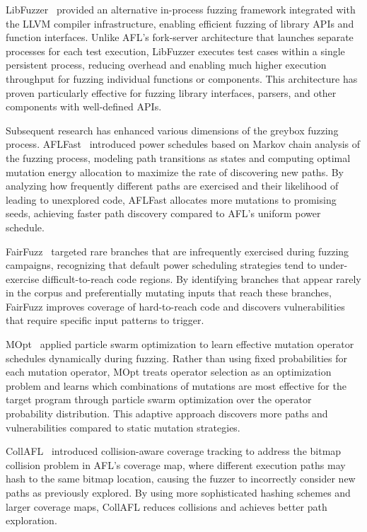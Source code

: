 \documentclass[review]{elsarticle}
\begin{document}
LibFuzzer~\cite{libfuzzer} provided an alternative in-process fuzzing framework integrated with the LLVM compiler infrastructure, enabling efficient fuzzing of library APIs and function interfaces. Unlike AFL's fork-server architecture that launches separate processes for each test execution, LibFuzzer executes test cases within a single persistent process, reducing overhead and enabling much higher execution throughput for fuzzing individual functions or components. This architecture has proven particularly effective for fuzzing library interfaces, parsers, and other components with well-defined APIs.

Subsequent research has enhanced various dimensions of the greybox fuzzing process. AFLFast~\cite{aflfast} introduced power schedules based on Markov chain analysis of the fuzzing process, modeling path transitions as states and computing optimal mutation energy allocation to maximize the rate of discovering new paths. By analyzing how frequently different paths are exercised and their likelihood of leading to unexplored code, AFLFast allocates more mutations to promising seeds, achieving faster path discovery compared to AFL's uniform power schedule.

FairFuzz~\cite{fairfuzz} targeted rare branches that are infrequently exercised during fuzzing campaigns, recognizing that default power scheduling strategies tend to under-exercise difficult-to-reach code regions. By identifying branches that appear rarely in the corpus and preferentially mutating inputs that reach these branches, FairFuzz improves coverage of hard-to-reach code and discovers vulnerabilities that require specific input patterns to trigger.

MOpt~\cite{mopt} applied particle swarm optimization to learn effective mutation operator schedules dynamically during fuzzing. Rather than using fixed probabilities for each mutation operator, MOpt treats operator selection as an optimization problem and learns which combinations of mutations are most effective for the target program through particle swarm optimization over the operator probability distribution. This adaptive approach discovers more paths and vulnerabilities compared to static mutation strategies.

CollAFL~\cite{collafl} introduced collision-aware coverage tracking to address the bitmap collision problem in AFL's coverage map, where different execution paths may hash to the same bitmap location, causing the fuzzer to incorrectly consider new paths as previously explored. By using more sophisticated hashing schemes and larger coverage maps, CollAFL reduces collisions and achieves better path exploration.
\end{document}
